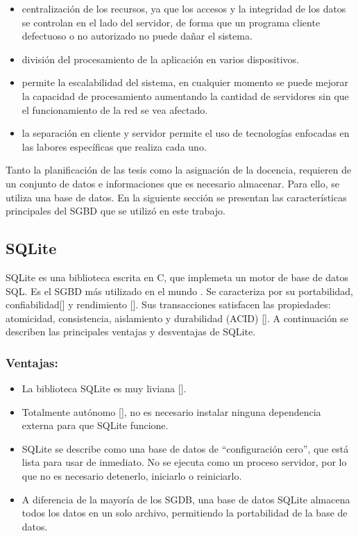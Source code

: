\begin{itemize}
    \item centralización de los recursos, ya que los accesos y la integridad de los datos se controlan en el lado del servidor, de forma que un programa cliente defectuoso o no autorizado no puede dañar el sistema.
    \item división del procesamiento de la aplicación en varios dispositivos.
    \item permite la escalabilidad del sistema, en cualquier momento se puede mejorar la capacidad de procesamiento aumentando la cantidad de servidores sin que el funcionamiento de la red se vea afectado.
    \item la separación en cliente y servidor permite el uso de tecnologías enfocadas en las labores específicas que realiza cada uno. 
\end{itemize}
 

Tanto la planificación de las tesis como la asignación de la docencia, requieren de un 
conjunto de datos e informaciones que es necesario almacenar. Para ello, se 
utiliza una base de datos. En la siguiente sección se presentan las características 
principales del SGBD que se utilizó en este trabajo.

\subsection{SQLite}

SQLite es una biblioteca escrita en C, que implemeta un motor de base de datos SQL.
Es el SGBD más utilizado en el mundo \cite{sqlite_most_used}.
Se caracteriza por su portabilidad, confiabilidad[\cite{sqlite_high_reliability}] y rendimiento [\cite{sqlite_fast}]. Sus transacciones 
satisfacen las propiedades: atomicidad, consistencia, aislamiento y durabilidad (ACID) [\cite{acid}]. A continuación se describen las principales ventajas 
y desventajas de SQLite.

\subsubsection{Ventajas:}

\begin{itemize}
    \item La biblioteca SQLite es muy liviana [\cite{sqlite_small}].
    \item Totalmente autónomo [\cite{sqlite_self_contained}], no es necesario instalar ninguna dependencia externa para que 
    SQLite funcione.
    \item SQLite se describe como una base de datos de ``configuración cero'', que está lista para 
    usar de inmediato. No se ejecuta como un proceso servidor, por lo que no es necesario detenerlo,
    iniciarlo o reiniciarlo.
    \item A diferencia de la mayoría de los SGDB, una base de datos SQLite almacena todos los datos
    en un solo archivo, permitiendo la portabilidad de la base de datos. 
\end{itemize}


